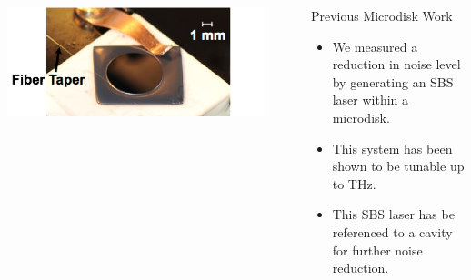 \documentclass{beamer}
\begin{document}
\begin{frame}
\begin{columns}
\includegraphics[width=0.9\textwidth]{Images/Microdisk.png}\\
\begin{block}{Previous Microdisk Work}
\begin{itemize}
\item We measured a reduction in noise level by generating an SBS laser within a microdisk.
\item This system has been shown to be tunable up to THz.
\item This SBS laser has be referenced to a cavity for further noise reduction.
\end{itemize}
\end{block}
\end{columns}
\end{frame}
\end{document}
